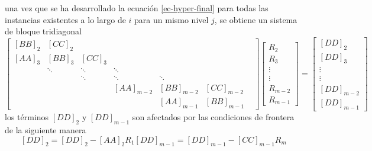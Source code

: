 \documentclass[letterpaper, openright, 12pt]{book}
\begin{document}
		 una vez que se ha desarrollado la ecuación \ref{ec-hyper-final} para todas las instancias existentes a lo largo de $i$ para un mismo nivel $j$, se obtiene un sistema de bloque tridiagonal
		 \begin{equation}
			 \begin{bmatrix}
				 \left[ BB \right]_2 & \left[ CC \right]_2 & & & & \\
				 \left[AA\right]_3 & \left[BB\right]_3 & \left[CC\right]_3 & & & \\
				 & \ddots & \ddots &  \ddots & & \\
				 & & \ddots & \ddots & \ddots & & \\
				 & & & \left[AA\right]_{m-2} & \left[BB\right]_{m-2} & \left[CC\right]_{m-2}\\
				 & & & & \left[AA\right]_{m-1} & \left[BB\right]_{m-1}
			 \end{bmatrix}
			 \begin{bmatrix}
				 R_{2}\\
				 R_{3}\\
				 \vdots\\
				 \vdots\\
				 R_{m-2}\\
				 R_{m-1}
			 \end{bmatrix}
			 = \begin{bmatrix}
				 \left[DD\right]_2\\
				 \left[DD\right]_3\\
				 \vdots\\
				 \vdots\\
				 \left[DD\right]_{m-2}\\
				 \left[DD\right]_{m-1}
			 \end{bmatrix}
		 \end{equation}
		 los términos $\left[DD\right]_2$ y $\left[DD\right]_{m - 1}$ son afectados por las condiciones de frontera de la siguiente manera
		 \begin{subequations}
		 	\begin{equation*}
			 	\left[DD\right]_2 = \left[DD\right]_2 - \left[AA\right]_2 R_1
		 	\end{equation*}
		 	\begin{equation*}
			 	\left[DD\right]_{m - 1} = \left[DD\right]_{m - 1} - \left[CC\right]_{m - 1} R_{m}
		 	\end{equation*}
		 \end{subequations}
			
			
				
	
\end{document}
